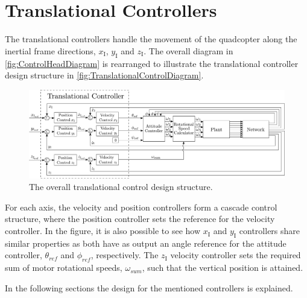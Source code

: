 \section{Translational Controllers} \label{sec:TranslationalController}

The translational controllers handle the movement of the quadcopter along the inertial frame directions, $x_{\mathrm{I}}$, $y_{\mathrm{I}}$ and $z_{\mathrm{I}}$. The overall diagram in \autoref{fig:ControlHeadDiagram} is rearranged to illustrate the translational controller design structure in \autoref{fig:TranslationalControlDiagram}.
%
\begin{figure}[H]
	\centering
	\includegraphics[scale=0.22]{figures/TranslationalControlDiagramexpanded}
	\caption{The overall translational control design structure.}
	\label{fig:TranslationalControlDiagram}
\end{figure}
%
For each axis, the velocity and position controllers form a cascade control structure, where the position controller sets the reference for the velocity controller. In the figure, it is also possible to see how $x_{\mathrm{I}}$ and $y_{\mathrm{I}}$ controllers share similar properties as both have as output an angle reference for the attitude controller, $\theta_{ref}$ and $\phi_{ref}$, respectively. 
The $z_{\mathrm{I}}$ velocity controller sets the required sum of motor rotational speeds, $\omega_{sum}$, such that the vertical position is attained.

In the following sections the design for the mentioned controllers is explained.
